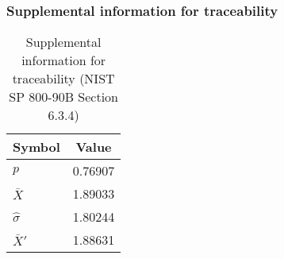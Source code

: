 \documentclass[a3paper,xelatex,english]{bxjsarticle}
\begin{document}
\subsubsection{Supplemental information for traceability}
\renewcommand{\arraystretch}{1.8}
\begin{table}[h]
\caption{Supplemental information for traceability (NIST SP 800-90B Section 6.3.4)}
\begin{center}
\begin{tabular}{|l|c|}
\hline 
\rowcolor{anotherlightblue} %
Symbol				& Value \\ \hline 
$p$				&  0.76907\\ \hline 
$\bar{X}$ 		&  1.89033\\ \hline
$\hat{\sigma}$		&  1.80244\\ \hline
$\bar{X}'$ 		&  1.88631\\ \hline
\end{tabular}
\end{center}
\end{table}
\renewcommand{\arraystretch}{1.4}
\clearpage
\end{document}

